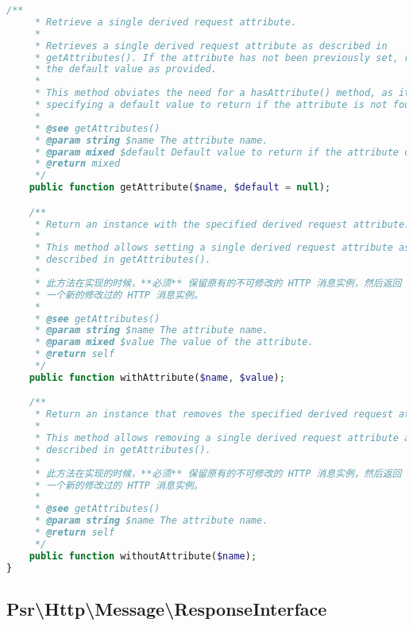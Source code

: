 \begin{lstlisting}[language=PHP]
    /**
     * Retrieve a single derived request attribute.
     *
     * Retrieves a single derived request attribute as described in
     * getAttributes(). If the attribute has not been previously set, returns
     * the default value as provided.
     *
     * This method obviates the need for a hasAttribute() method, as it allows
     * specifying a default value to return if the attribute is not found.
     *
     * @see getAttributes()
     * @param string $name The attribute name.
     * @param mixed $default Default value to return if the attribute does not exist.
     * @return mixed
     */
    public function getAttribute($name, $default = null);

    /**
     * Return an instance with the specified derived request attribute.
     *
     * This method allows setting a single derived request attribute as
     * described in getAttributes().
     *
     * 此方法在实现的时候，**必须** 保留原有的不可修改的 HTTP 消息实例，然后返回
     * 一个新的修改过的 HTTP 消息实例。
     *
     * @see getAttributes()
     * @param string $name The attribute name.
     * @param mixed $value The value of the attribute.
     * @return self
     */
    public function withAttribute($name, $value);

    /**
     * Return an instance that removes the specified derived request attribute.
     *
     * This method allows removing a single derived request attribute as
     * described in getAttributes().
     *
     * 此方法在实现的时候，**必须** 保留原有的不可修改的 HTTP 消息实例，然后返回
     * 一个新的修改过的 HTTP 消息实例。
     *
     * @see getAttributes()
     * @param string $name The attribute name.
     * @return self
     */
    public function withoutAttribute($name);
}
\end{lstlisting}

\subsection{Psr\textbackslash Http\textbackslash Message\textbackslash ResponseInterface}


